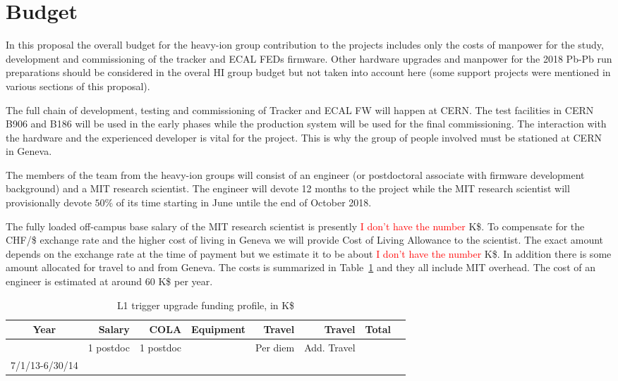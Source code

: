 \section{Budget}
\label{sec:funding}

In this proposal the overall budget for the heavy-ion group contribution to the projects includes only the costs of manpower for the study, development and commissioning of the tracker and ECAL FEDs firmware. Other hardware upgrades and manpower for the 2018 Pb-Pb run preparations should be considered in the overal HI group budget but not taken into account here (some support projects were mentioned in various sections of this proposal).

The full chain of development, testing and commissioning of Tracker and ECAL FW will happen at CERN. The test facilities in CERN B906 and B186 will be used in the early phases while the production system will be used for the final commissioning. The interaction with the hardware and the experienced developer is vital for the project. This is why the group of people involved must be stationed at CERN in Geneva.

The members of the team from the heavy-ion groups will consist of an engineer (or postdoctoral associate with firmware development background)  and a MIT research scientist. The engineer will devote 12 months to the project while the MIT research scientist will provisionally devote $50\%$ of its time starting in June untile the end of October 2018. 
 

The fully loaded off-campus base salary of the MIT research scientist is presently \textcolor{red}{I don't have the number} K\$. To compensate for the CHF/\$ exchange rate and the higher cost of living in Geneva we will provide Cost of Living Allowance to the scientist. The exact amount depends on the exchange rate at the time of payment but we estimate it to be about \textcolor{red}{I don't have the number} K\$. In addition there is some amount allocated for travel to and from Geneva. The costs is summarized in Table~\ref{OpCost} and they all include MIT overhead. The cost of an engineer is estimated at around 60 K\$ per year.

\begin{table}[hbt]
\begin{center}
\begin{tabular}{|c|r|r|r|r|r|r|r|}
\hline
Year        & Salary & COLA & Equipment & Travel & Travel& Total \\ \hline
            &  1 postdoc   & 1 postdoc   &  & Per diem       &  Add. Travel     &     \\ \hline
7/1/13-6/30/14  &     &    &       &   &      &    \\ \hline
\end{tabular}
\end{center}
\caption{L1 trigger upgrade funding profile, in K\$}
\label{OpCost}
\end{table}

